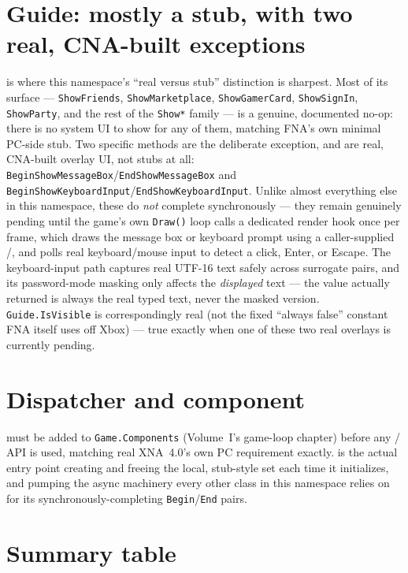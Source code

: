 \section{Guide: mostly a stub, with two real, CNA-built exceptions}

 is where this namespace's ``real versus stub'' distinction is sharpest. Most
of its surface --- \texttt{ShowFriends}, \texttt{ShowMarketplace}, \texttt{ShowGamerCard},
\texttt{ShowSignIn}, \texttt{ShowParty}, and the rest of the \texttt{Show*} family --- is a
genuine, documented no-op: there is no system UI to show for any of them, matching FNA's own
minimal PC-side stub. Two specific methods are the deliberate exception, and are real, CNA-built
overlay UI, not stubs at all: \texttt{BeginShowMessageBox}/\texttt{EndShowMessageBox} and
\texttt{BeginShowKeyboardInput}/\texttt{EndShowKeyboardInput}. Unlike almost everything else
in this namespace, these do \emph{not} complete synchronously --- they remain genuinely
pending until the game's own \texttt{Draw()} loop calls a dedicated render hook once per
frame, which draws the message box or keyboard prompt using a caller-supplied
/, and polls real keyboard/mouse input to detect a
click, Enter, or Escape. The keyboard-input path captures real UTF-16 text safely across
surrogate pairs, and its password-mode masking only affects the \emph{displayed} text --- the
value actually returned is always the real typed text, never the masked version.
\texttt{Guide.IsVisible} is correspondingly real (not the fixed ``always false'' constant FNA
itself uses off Xbox) --- true exactly when one of these two real overlays is currently
pending.

\section{Dispatcher and component}

 must be added to \texttt{Game.Components}
(Volume~I's game-loop chapter) before any / API is
used, matching real XNA~4.0's own PC requirement exactly. 
is the actual entry point creating and freeing the local, stub-style
 set each time it initializes, and pumping the async machinery every
other class in this namespace relies on for its synchronously-completing
\texttt{Begin}/\texttt{End} pairs.

\section{Summary table}

